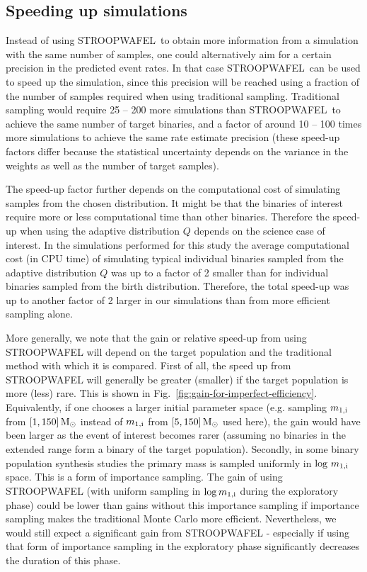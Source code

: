 \documentclass[a4paper,fleqn,usenatbib,useAMS,usedcolumn]{mnras}
\newcommand{\AISs}{\textsc{STROOPWAFEL}}
\begin{document}
\subsection{Speeding up simulations}
\label{subsec:VerificationCOMPASspeedUp}

Instead of using \AISs \ to obtain more information from a simulation with the same number of samples, one could alternatively aim for a certain precision in the predicted event rates. In that case \AISs \ can be used to speed up the simulation, since this precision will be reached using a fraction of the number of samples required when using traditional sampling.   Traditional sampling would require 25 -- 200 more simulations than \AISs \ to achieve the same number of target binaries, and a factor of around 10 -- 100 times more simulations to achieve the same rate estimate precision (these speed-up factors differ because the statistical uncertainty depends on the variance in the weights as well as the number of target samples).

The speed-up factor further depends on the computational cost of simulating samples from the chosen distribution.  It might be that the binaries of interest require more or less computational time than other binaries. Therefore the speed-up when using the adaptive distribution $Q$ depends on the science case of interest. In the simulations performed for this study the average computational cost (in CPU time) of simulating typical individual binaries sampled from the adaptive distribution $Q$ was up to a factor of 2 smaller than for individual binaries sampled from the birth distribution.  Therefore, the total speed-up was up to another factor of 2 larger in our simulations than from more efficient sampling alone.  


More generally, we note that the gain or relative speed-up from using \AISs{}  will depend on the target population and the traditional method with which it is compared.  First of all, the speed up from \AISs{} will generally be greater (smaller) if the target population is more (less) rare. This is shown in Fig.~\ref{fig:gain-for-imperfect-efficiency}. Equivalently, if one chooses a larger initial parameter space (e.g. sampling $m_{\rm{1,i}}$ from $[1,150] \,\rm{M}_{\odot}$ instead of  $m_{\rm{1,i}}$ from $[5,150] \,\rm{M}_{\odot}$ used here), the gain would have been larger as the event of interest becomes rarer (assuming no binaries in the extended range form a binary of the target population).  Secondly, in some binary population synthesis studies the primary mass is sampled uniformly in  $\log \, m_{\rm{1,i}}$ space. This is a form of importance sampling. The gain of using \AISs{} (with uniform sampling in $\log m_{\rm{1,i}}$ during the exploratory phase) could be lower than gains without this importance sampling if importance sampling makes the traditional Monte Carlo more efficient. Nevertheless, we would still expect a significant gain from  \AISs{} - especially if using that form of importance sampling in the exploratory phase significantly decreases the duration of this phase. 
\end{document}
